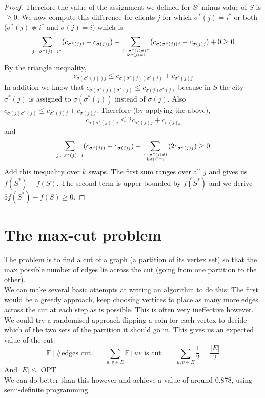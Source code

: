 \documentclass{article}
\theoremstyle{definition}
\newcommand{\bb}[1]{\mathbb{#1}}
\DeclareMathOperator{\OPT}{OPT}
\begin{document}
\begin{proof}
Therefore the value of the assignment we defined for $S'$ minus value of $S$ is $\ge 0$.
We now compute this difference for clients $j$ for which $\sigma^*(j) = i^*$ or both ($\sigma^*(j) \ne i^*$ and $\sigma(j) = i$) which is
$$\sum_{j\colon \sigma^*(j) = i^*} (c_{\sigma^*(j)j} - c_{\sigma(j)j}) + \sum_{j\colon \sigma^*(j) \ne i^* \atop \& \sigma(j) = i} (c_{\sigma(\sigma^*(j))j} - c_{\sigma(j)j}) + 0 \ge 0$$
By the triangle inequality, 
$$c_{\sigma(\sigma^*(j))j}\le c_{\sigma(\sigma^*(j))\sigma^*(j)} + c_{\sigma^*(j)j}$$
In addition we know that $c_{\sigma(\sigma^*(j))\sigma^*(j)}\le c_{\sigma(j)\sigma^*(j)}$ because in $S$ the city $\sigma^*(j)$ is assigned to $\sigma(\sigma^*(j))$ instead of $\sigma(j)$.
Also $c_{\sigma(j)\sigma^*(j)}\le c_{\sigma^*(j)j} + c_{\sigma(j)j}$.
Therefore (by applying the above),
$$c_{\sigma(\sigma^*(j))j}\le 2c_{\sigma^*(j)j}+c_{\sigma(j)j}$$
and
$$\sum_{j\colon \sigma^*(j)=i} (c_{\sigma^*(j)j} - c_{\sigma(j)j}) + \sum_{j\colon \sigma^*(j)\ne i \atop \& \sigma(j) = i} (2c_{\sigma^*(j)j})\ge 0$$
Add this inequality over $k$ swaps.
The first sum ranges over all $j$ and gives us $f(S^*) - f(S)$.
The second term is upper-bounded by $f(S^*)$ and we derive $5f(S^*) - f(S) \ge 0$.
\end{proof}


\section{The max-cut problem}

The problem is to find a cut of a graph (a partition of its vertex set) so that the max possible number of edges lie across the cut (going from one partition to the other).\\
We can make several basic attempts at writing an algorithm to do this:
The first would be a greedy approach, keep choosing vertices to place as many more edges across the cut at each step as is possible.
This is often very ineffective however. \\
We could try a randomised approach flipping a coin for each vertex to decide which of the two sets of the partition it should go in.
This gives us an expected value of the cut:
$$\bb E[\#\text{edges cut}] = \sum_{u,v\in E}\bb E[uv\text{ is cut}] = \sum_{u,v\in E} \frac{1}{2} = \frac{|E|}{2}$$
And $|E|\le \OPT$. \\
We can do better than this however and achieve a value of around 0.878, using semi-definite programming.
\end{document}
